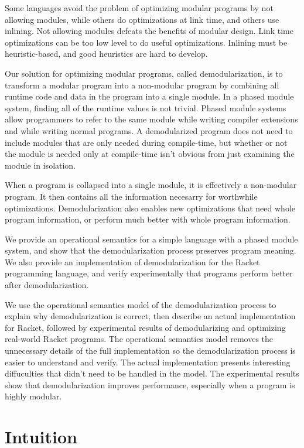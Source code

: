\documentclass{llncs}
\begin{document}
Some languages avoid the problem of optimizing modular programs by not allowing modules, while others do optimizations at link time, and others use inlining. 
Not allowing modules defeats the benefits of modular design. 
Link time optimizations can be too low level to do useful optimizations. 
Inlining must be heuristic-based, and good heuristics are hard to develop. 

Our solution for optimizing modular programs, called demodularization, is to transform a modular program into a non-modular program by combining all runtime code and data in the program into a single module.
In a phased module system, finding all of the runtime values is not trivial.
Phased module systems allow programmers to refer to the same module while writing compiler extensions and while writing normal programs.
A demodularized program does not need to include modules that are only needed during compile-time, but whether or not the module is needed only at compile-time isn't obvious from just examining the module in isolation. 

When a program is collapsed into a single module, it is effectively a non-modular program. It then contains all the information necesarry for worthwhile optimizations. Demodularization also enables new optimizations that need whole program information, or perform much better with whole program information. 

We provide an operational semantics for a simple language with a phased module system, and show that the demodularization process preserves program meaning. We also provide an implementation of demodularization for the Racket programming language, and verify experimentally that programs perform better after demodularization.

We use the operational semantics model of the demodularization process to explain why demodularization is correct, then describe an actual implementation for Racket, followed by experimental results of demodularizing and optimizing real-world Racket programs. The operational semantics model removes the unnecessary details of the full implementation so the demodularization process is easier to understand and verify. The actual implementation presents interesting diffuculties that didn't need to be handled in the model. The experimental results show that demodularization improves performance, especially when a program is highly modular. 

\section{Intuition}
\end{document}
